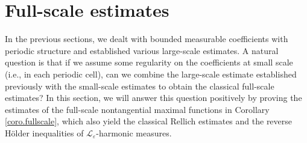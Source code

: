 \documentclass[reqno,12pt]{amsart} %
\newtheorem{theorem}{Theorem}[section]
\theoremstyle{definition}
\theoremstyle{remark}
\numberwithin{equation}{section}
\newcommand{\cL}{\mathcal{L}}
\newcommand{\e}{\varepsilon}
\DeclareMathOperator{\diam}{diam}
\begin{document}


\section{Full-scale estimates}\label{sec.full-scale}

In the previous sections, we dealt with bounded measurable coefficients with periodic structure and established various large-scale estimates. A natural question is that if we assume some regularity on the coefficients at small scale (i.e., in each periodic cell), can we combine the large-scale estimate established previously with the small-scale estimates to obtain the classical full-scale estimates? In this section, we will answer this question positively by proving the estimates of the full-scale nontangential maximal functions in Corollary \ref{coro.fullscale}, which also yield the classical Rellich estimates and the reverse H\"{o}lder inequalities of $\cL_\e$-harmonic measures.
\end{document}
